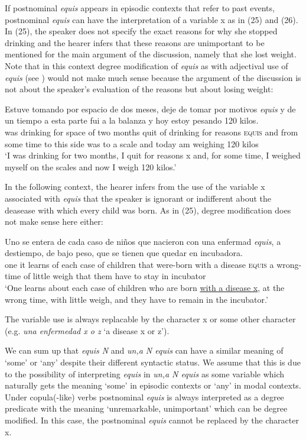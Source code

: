 \documentclass[output=paper]{langsci/langscibook}
\begin{document}
If postnominal \textit{equis} appears in episodic contexts that refer to past events, postnominal \textit{equis} can have the interpretation of a variable x as in (25) and (26). In (25), the speaker does not specify the exact reasons for why she stopped drinking and the hearer infers that these reasons are unimportant to be mentioned for the main argument of the discussion, namely that she lost weight. Note that in this context degree modification of \textit{equis} as with adjectival use of \textit{equis} (see ) would not make much sense because the argument of the discussion is not about the speaker's evaluation of the reasons but about losing weight:

\ea
\gll  Estuve tomando por espacio de dos meses, deje de tomar por motivos \textit{equis} y de un tiempo a esta parte fui a la balanza y hoy estoy pesando 120 kilos.\\
was drinking for space of two months quit of drinking for reasons \textsc{equis} and from some time to this side was to a scale and today am weighing 120 kilos\\
\glt ‘I was drinking for two months, I quit for reasons x and, for some time, I weighed myself on the scales and now I weigh 120 kilos.’
\z

In the following context, the hearer infers from the use of the variable x associated with \textit{equis} that the speaker is ignorant or indifferent about the deasease with which every child was born. As in (25), degree modification does not make sense here either:

\ea
\gll  Uno se entera de cada caso de niños que nacieron con una enfermad \textit{equis}, a destiempo, de bajo peso, que se tienen que quedar en incubadora.\\
one it learns of each case of children that were-born with a disease \textsc{equis} a wrong-time of little weigh that them have to stay in incubator\\
\glt ‘One learns about each case of children who are born \underline{with a disease x}, at the wrong time, with little weigh, and they have to remain in the incubator.’
\z

The variable use is always replacable by the character x or some other character (e.g. \textit{una enfermedad x o z} ‘a disease x or z’).

We can sum up that \textit{equis N} and \textit{un,a N equis} can have a similar meaning of ‘some’ or ‘any’ despite their different syntactic status. We assume that this is due to the possibility of interpreting \textit{equis} in \textit{un,a N equis} as some variable which naturally gets the meaning ‘some’ in episodic contexts or ‘any’ in modal contexts. Under copula(-like) verbs postnominal \textit{equis} is always interpreted as a degree predicate with the meaning ‘unremarkable, unimportant’ which can be degree modified. In this case, the postnominal \textit{equis} cannot be replaced by the character x.
\end{document}
